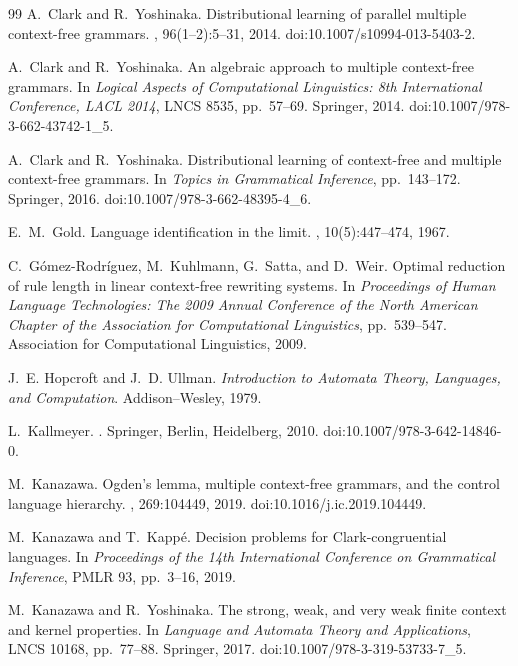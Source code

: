\documentclass[11pt,a4paper]{ltjsarticle}
\numberwithin{equation}{section}
\theoremstyle{plain}
\theoremstyle{definition}
\theoremstyle{remark}
\begin{document}
\begin{thebibliography}{99}
A.~Clark and R.~Yoshinaka.
\newblock Distributional learning of parallel multiple context-free grammars.
, 96(1--2):5--31, 2014.
\newblock doi:10.1007/s10994-013-5403-2.


A.~Clark and R.~Yoshinaka.
\newblock An algebraic approach to multiple context-free grammars.
\newblock In {\em Logical Aspects of Computational Linguistics: 8th International
Conference, LACL 2014}, LNCS 8535, pp.~57--69. Springer, 2014.
\newblock doi:10.1007/978-3-662-43742-1\_5.

A.~Clark and R.~Yoshinaka.
\newblock Distributional learning of context-free and multiple context-free
grammars.
\newblock In {\em Topics in Grammatical Inference}, pp.~143--172. Springer,
2016.
\newblock doi:10.1007/978-3-662-48395-4\_6.

E.~M.~Gold.
\newblock Language identification in the limit.
, 10(5):447--474, 1967.

C.~G\'omez-Rodr\'iguez, M.~Kuhlmann, G.~Satta, and D.~Weir.
\newblock Optimal reduction of rule length in linear context-free rewriting systems.
\newblock In {\em Proceedings of Human Language Technologies: The 2009 Annual
Conference of the North American Chapter of the Association for Computational
Linguistics}, pp.~539--547. Association for Computational Linguistics, 2009.

J.~E. Hopcroft and J.~D. Ullman.
\newblock \emph{Introduction to Automata Theory, Languages, and Computation}.
\newblock Addison--Wesley, 1979.

L.~Kallmeyer.
.
\newblock Springer, Berlin, Heidelberg, 2010.
\newblock doi:10.1007/978-3-642-14846-0.

M.~Kanazawa.
\newblock Ogden's lemma, multiple context-free grammars, and the control language hierarchy.
, 269:104449, 2019.
\newblock doi:10.1016/j.ic.2019.104449.

M.~Kanazawa and T.~Kapp\'{e}.
\newblock Decision problems for Clark-congruential languages.
\newblock In {\em Proceedings of the 14th International Conference on
Grammatical Inference}, PMLR 93, pp.~3--16, 2019.

M.~Kanazawa and R.~Yoshinaka.
\newblock The strong, weak, and very weak finite context and kernel properties.
\newblock In {\em Language and Automata Theory and Applications}, LNCS 10168,
pp.~77--88. Springer, 2017.
\newblock doi:10.1007/978-3-319-53733-7\_5.


\end{thebibliography}
\end{document}
